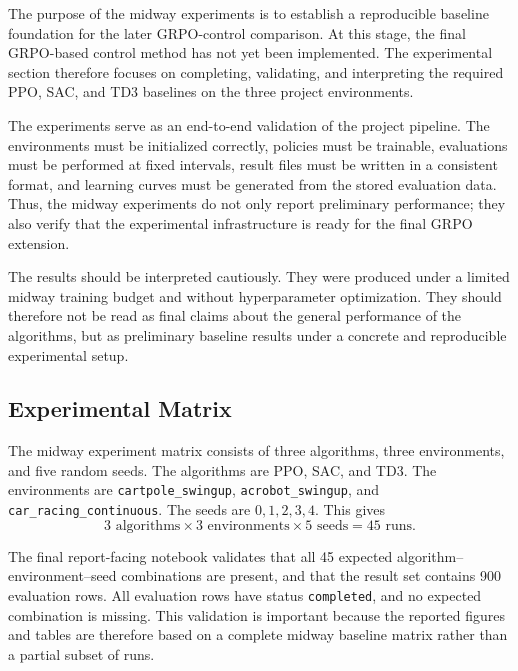 
\label{sec:experiments}

The purpose of the midway experiments is to establish a reproducible baseline foundation for the later GRPO-control comparison. At this stage, the final GRPO-based control method has not yet been implemented. The experimental section therefore focuses on completing, validating, and interpreting the required PPO, SAC, and TD3 baselines on the three project environments.

The experiments serve as an end-to-end validation of the project pipeline. The environments must be initialized correctly, policies must be trainable, evaluations must be performed at fixed intervals, result files must be written in a consistent format, and learning curves must be generated from the stored evaluation data. Thus, the midway experiments do not only report preliminary performance; they also verify that the experimental infrastructure is ready for the final GRPO extension.

The results should be interpreted cautiously. They were produced under a limited midway training budget and without hyperparameter optimization. They should therefore not be read as final claims about the general performance of the algorithms, but as preliminary baseline results under a concrete and reproducible experimental setup.

\subsection{Experimental Matrix}
\label{sec:experimental-matrix}

The midway experiment matrix consists of three algorithms, three environments, and five random seeds. The algorithms are PPO, SAC, and TD3. The environments are \texttt{cartpole\_swingup}, \texttt{acrobot\_swingup}, and \texttt{car\_racing\_continuous}. The seeds are $0,1,2,3,4$. This gives
\[
3 \text{ algorithms} \times 3 \text{ environments} \times 5 \text{ seeds}
=
45 \text{ runs}.
\]

The final report-facing notebook validates that all 45 expected algorithm--environment--seed combinations are present, and that the result set contains 900 evaluation rows. All evaluation rows have status \texttt{completed}, and no expected combination is missing. This validation is important because the reported figures and tables are therefore based on a complete midway baseline matrix rather than a partial subset of runs.

